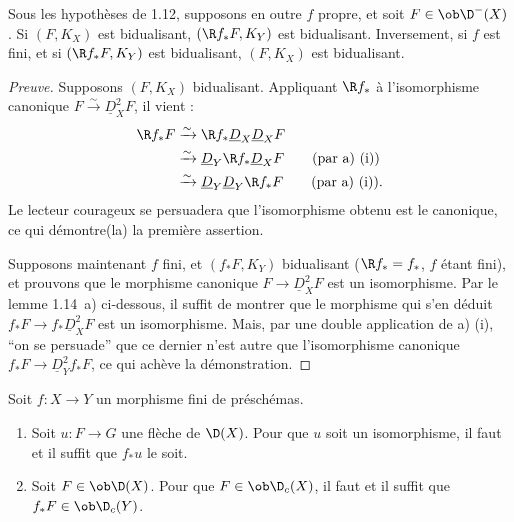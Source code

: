 \begin{corollary}
Sous les hypothèses de 1.12, supposons en outre $f$ propre, et soit $F \in \ob \D^{-}(X)$. Si $(F, K_X)$ est bidualisant, $(\R f_{*}F, K_Y)$ est bidualisant. Inversement, si $f$ est fini, et si $(\R f_{*}F, K_Y)$ est bidualisant, $(F, K_X)$ est bidualisant.
\end{corollary}

\begin{proof}[Preuve]
Supposons $(F, K_X)$ bidualisant. Appliquant $\R f_{*}$ à l'isomorphisme canonique $F \xrightarrow{\sim} \underline{D}_X^{2} F$, il vient :
\begin{align*}
\R f_{*} F &\xrightarrow{\sim} \R f_{*} \underline{D}_X \underline{D}_X F \\
&\xrightarrow{\sim} \underline{D}_Y \R f_{*} \underline{D}_X F \qquad \text{(par a) (i))} \\
&\xrightarrow{\sim} \underline{D}_Y \underline{D}_Y \R f_{*} F \qquad \text{(par a) (i)).}
\end{align*}
Le lecteur courageux se persuadera que l'isomorphisme obtenu est le canonique, ce qui démontre(la) la première assertion.

Supposons maintenant $f$ fini, et $(f_{*}F, K_Y)$ bidualisant ($\R f_{*} = f_{*}$, $f$ étant fini), et prouvons que le morphisme canonique $F \to \underline{D}_X^{2} F$ est un isomorphisme. Par le lemme 1.14~a) ci-dessous, il suffit de montrer que le morphisme qui s'en déduit $f_{*}F \to f_{*}\underline{D}_X^{2} F$ est un isomorphisme. Mais, par une double application de a) (i), ``on se persuade'' que ce dernier n'est autre que l'isomorphisme canonique $f_{*}F \to \underline{D}_Y^{2} f_{*}F$, ce qui achève la démonstration.
\end{proof}

\begin{lemma}
Soit $f : X \to Y$ un morphisme fini de préschémas.
\begin{enumerate}
\item[a)] Soit $u : F \to G$ une flèche de $\D(X)$. Pour que $u$ soit un isomorphisme, il faut et il suffit que $f_{*}u$ le soit.
\item[b)] Soit $F \in \ob \D(X)$. Pour que $F \in \ob \D_c(X)$, il faut et il suffit que $f_{*}F \in \ob \D_c(Y)$.
\end{enumerate}
\end{lemma}

